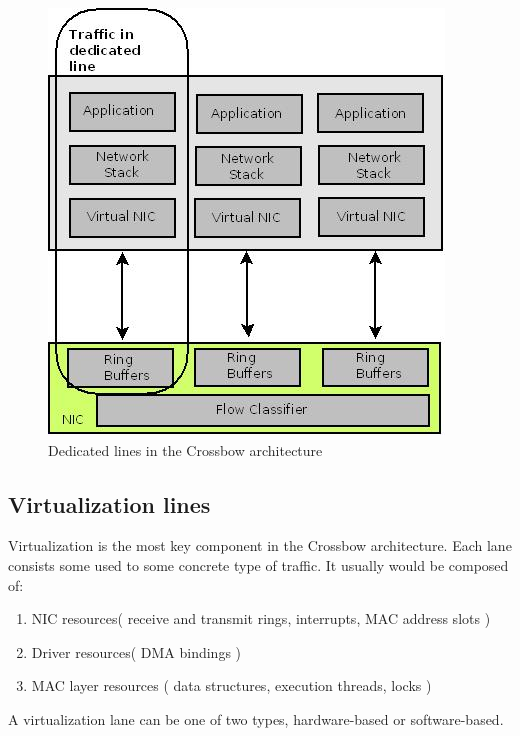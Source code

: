 \documentclass[11pt]{book}
\begin{document}
      
 \begin{figure}[H]
      \includegraphics[width=\textwidth]{img/crossbow-traffic-dedicated-line.jpeg}
      \caption{Dedicated lines in the Crossbow architecture}
 \end{figure}
		
		\subsection{Virtualization lines}

      Virtualization is the most key component in the Crossbow architecture. Each lane consists some
			used to some concrete type of traffic. It usually would be composed of: 
			\begin{enumerate}
				\item{NIC resources( receive and transmit rings, interrupts, MAC address slots )}
				\item{Driver resources( DMA bindings )}
				\item{MAC layer resources ( data structures, execution threads, locks )}
			\end{enumerate}
			
			A virtualization lane can be one of two types, hardware-based or software-based.
			
\end{document}
